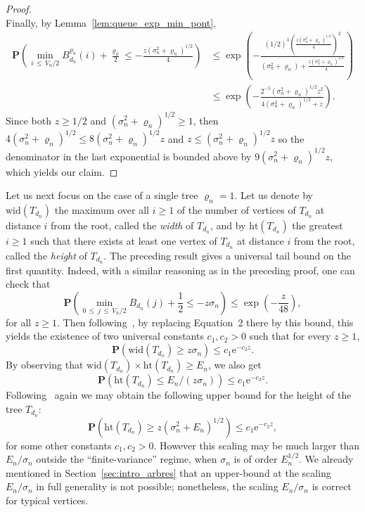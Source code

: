 \documentclass[AHL,Unicode,longabstracts,published]{cedram}
\newcommand{\ensembles}[1]{\mathbf{#1}}
\renewcommand{\P}{\ensembles{P}}
\renewcommand{\Pr}[1]{\P\left(#1\right)}
\newcommand{\1}{\ensembles{1}}
\renewcommand{\le}{\leqslant}
\renewcommand{\ge}{\geqslant}
\newcommand{\e}{\mathrm{e}}
\newcommand{\wid}{\mathrm{wid}}
\newcommand{\h}{\mathrm{ht}}
\newcommand{\tn}{T_{d_n}}
\newcommand{\Bfn}{B_{d_n}^{\varrho_n}}
\newcommand{\Btn}{B_{d_n}}
\newcommand{\edges}{E}
\newcommand{\vertices}{V}
\begin{document}
\begin{proof}
\[\]
Finally, by Lemma~\ref{lem:queue_exp_min_pont},
\begin{align*}
\Pr{\min_{i\,\le\,\vertices_n/2} \Bfn(i) + \frac{\varrho_n}{2} \le - \frac{z \left(\sigma_n^2+\varrho_n\right)^{1/2}}{4}} &\le \exp\left(- \frac{(1/2)^3 \left(\frac{z \left(\sigma_n^2+\varrho_n\right)^{1/2}}{4}\right)^2}{\left(\sigma_n^2+\varrho_n\right) + \frac{z\left(\sigma_n^2+\varrho_n\right)^{1/2}}{4}}\right)
\\
&\le \exp\left(- \frac{2^{-5}\left(\sigma_n^2+\varrho_n\right)^{1/2} z^2}{4\left(\sigma_n^2+\varrho_n\right)^{1/2} + z}\right).
\end{align*}
Since both $z \ge 1/2$ and $(\sigma_n^2+\varrho_n)^{1/2} \ge 1$, then $4(\sigma_n^2+\varrho_n)^{1/2} \le 8 (\sigma_n^2+\varrho_n)^{1/2} z$ and $z \le (\sigma_n^2+\varrho_n)^{1/2} z$ so the denominator in the last exponential is bounded above by $9 (\sigma_n^2+\varrho_n)^{1/2} z$, which yields our claim.
\end{proof}



Let us next focus on the case of a single tree $\varrho_n = 1$. Let us denote by $\wid(\tn)$ the maximum over all $i \ge 1$ of the number of vertices of $\tn$ at distance $i$ from the root, called the \emph{width} of $\tn$, and by $\h(\tn)$ the greatest $i \ge 1$ such that there exists at least one vertex of $\tn$ at distance $i$ from the root, called the \emph{height} of $\tn$. The preceding result gives a universal tail bound on the first quantity. Indeed, with a similar reasoning as in the preceding proof, one can check that
\begin{equation}\label{eq:queue_min_pont}
\Pr{\min_{0\,\le\,j\,\le\,\vertices_n/2} \Btn(j) + \frac{1}{2} \le - z \sigma_n}
\le \exp\left(- \frac{z}{48}\right),
\end{equation}
for all $z \ge 1$. Then following~\cite{AB12}, by replacing Equation~2 there by this bound, this yields the existence of two universal constants $c_1, c_2 > 0$ such that for every $z \ge 1$,
\[
\Pr{\wid(\tn) \ge z \sigma_n} \le c_1 \e^{- c_2 z}.
\]
By observing that $\wid(\tn) \times \h(\tn) \ge \edges_n$, we also get
\[
\Pr{\h(\tn) \le \edges_n / (z \sigma_n)} \le c_1 \e^{-c_2 z}.
\]
Following~\cite{AB12} again we may obtain the following upper bound for the height of the tree $\tn$:
\begin{equation}\label{eq:queue_exp_hauteur}
\Pr{\h\left(\tn\right) \ge z \left(\sigma_n^2+\edges_n\right)^{1/2}} \le c_1 \e^{-c_2 z},
\end{equation}
for some other constants $c_1, c_2 > 0$. However this scaling may be much larger than $\edges_n / \sigma_n$ outside the ``finite-variance'' regime, when $\sigma_n$ is of order $\edges_n^{1/2}$. We already mentioned in Section~\ref{sec:intro_arbres} that an upper-bound at the scaling $\edges_n / \sigma_n$ in full generality is not possible; nonetheless, the scaling $\edges_n / \sigma_n$ is correct for typical vertices.
\end{document}
